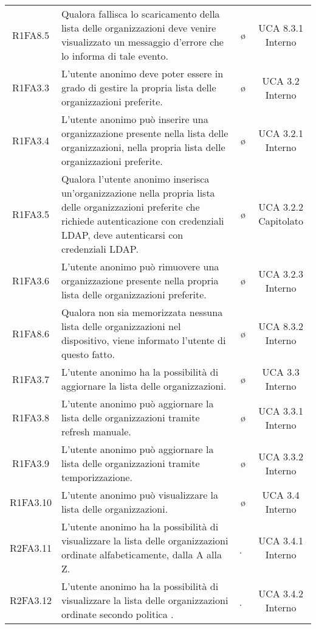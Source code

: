 {\begin{longtable}{ c C{6.5cm} c c}
R1FA8.5 & Qualora fallisca lo scaricamento della lista delle organizzazioni deve venire visualizzato un messaggio d'errore che lo informa di tale evento. & \o & UCA 8.3.1 Interno \\

R1FA3.3 & L’utente anonimo deve poter essere in grado di gestire la propria lista delle organizzazioni preferite. & \o & UCA 3.2 Interno \\

R1FA3.4 & L’utente anonimo può inserire una organizzazione presente nella lista delle organizzazioni, nella propria lista delle organizzazioni preferite. & \o & UCA 3.2.1 Interno \\

R1FA3.5 & Qualora l’utente anonimo inserisca un'organizzazione nella propria lista delle organizzazioni preferite che richiede autenticazione con credenziali LDAP, deve autenticarsi con credenziali LDAP. & \o & UCA 3.2.2 Capitolato\\

R1FA3.6 & L’utente anonimo può rimuovere una organizzazione presente nella propria lista delle organizzazioni preferite. & \o & UCA 3.2.3 Interno \\

R1FA8.6 & Qualora non sia memorizzata nessuna lista delle organizzazioni nel dispositivo, viene informato l’utente di questo fatto. & \o & UCA 8.3.2 Interno \\

R1FA3.7 & L’utente anonimo ha la possibilità di aggiornare la lista delle organizzazioni. & \o & UCA 3.3 Interno \\

R1FA3.8 & L’utente anonimo può aggiornare la lista delle organizzazioni tramite refresh manuale. & \o & UCA 3.3.1 Interno \\

R1FA3.9 & L’utente  anonimo può aggiornare la lista delle organizzazioni tramite temporizzazione. & \o & UCA 3.3.2 Interno \\

R1FA3.10 & L’utente anonimo può visualizzare la lista delle organizzazioni. & \o & UCA 3.4 Interno \\

R2FA3.11 & L’utente anonimo ha la possibilità di visualizzare la lista delle organizzazioni ordinate alfabeticamente, dalla A alla Z. & \d & UCA 3.4.1 Interno \\

R2FA3.12 & L’utente anonimo ha la possibilità di visualizzare la lista delle organizzazioni ordinate secondo politica . & \d & UCA 3.4.2 Interno \\


\end{longtable}}
